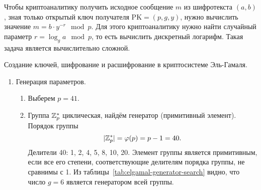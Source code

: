 Чтобы криптоаналитику получить исходное сообщение $m$ из шифротекста $(a, b)$, зная только открытый ключ получателя $\text{PK} = (p, g, y)$, нужно вычислить значение $m = b \cdot y^{-r} \mod p$. Для этого криптоаналитику нужно найти случайный параметр $r = \log_g a \mod p$, то есть вычислить дискретный логарифм. Такая задача является вычислительно сложной.

\example Создание ключей, шифрование и расшифрование в криптосистеме Эль-Гамаля.

\begin{enumerate}
    \item Генерация параметров.
        \begin{enumerate}
            \item Выберем $p=41$.
            \item Группа $\mathbb{Z}_p^*$ циклическая, найдём генератор (примитивный элемент). Порядок группы
                \[ |\mathbb{Z}_p^*| = \varphi(p) = p-1 = 40. \]
                Делители 40: 1, 2, 4, 5, 8, 10, 20. Элемент группы является примитивным, если все его степени, соответствующие делителям порядка группы, не сравнимы с 1. Из таблицы~\ref{tab:elgamal-generator-search} видно, что число $g = 6$ является генератором всей группы.
                \begin{table}[!ht]
                    \centering
                    \caption{Поиск генератора в циклической группе $\Z_{41}^*$. Элемент 6 -- генератор\label{tab:elgamal-generator-search}}
\end{table}
\end{enumerate}
\end{enumerate}

